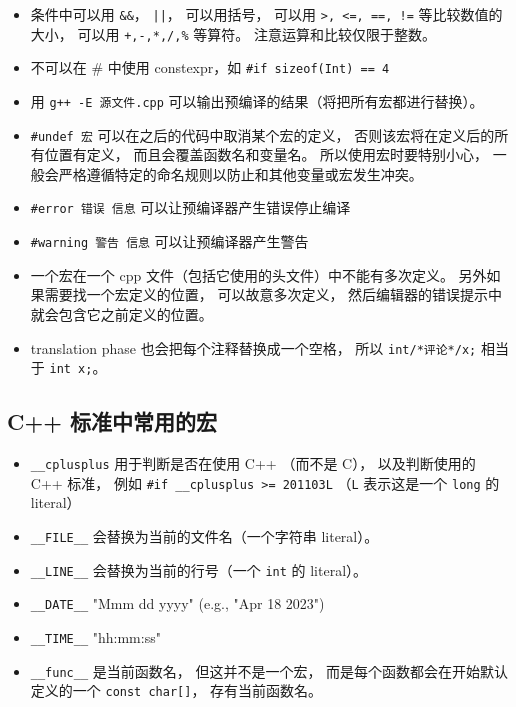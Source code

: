 \begin{itemize}
\item 条件中可以用 \verb`&&`， \verb`||`， 可以用括号， 可以用 \verb`>, <=, ==, !=` 等比较数值的大小， 可以用 \verb`+,-,*,/,%` 等算符。 注意运算和比较仅限于整数。
\item 不可以在 # 中使用 constexpr，如 \verb`#if sizeof(Int) == 4`
\item 用 \verb`g++ -E 源文件.cpp` 可以输出预编译的结果（将把所有宏都进行替换）。
\item \verb`#undef 宏` 可以在之后的代码中取消某个宏的定义， 否则该宏将在定义后的所有位置有定义， 而且会覆盖函数名和变量名。 所以使用宏时要特别小心， 一般会严格遵循特定的命名规则以防止和其他变量或宏发生冲突。
\item \verb`#error 错误 信息` 可以让预编译器产生错误停止编译
\item \verb`#warning 警告 信息` 可以让预编译器产生警告
\item 一个宏在一个 cpp 文件（包括它使用的头文件）中不能有多次定义。 另外如果需要找一个宏定义的位置， 可以故意多次定义， 然后编辑器的错误提示中就会包含它之前定义的位置。
\item translation phase 也会把每个注释替换成一个空格， 所以 \verb`int/*评论*/x;` 相当于 \verb`int x;`。
\end{itemize}

\subsection{C++ 标准中常用的宏}
\begin{itemize}
\item \verb`__cplusplus` 用于判断是否在使用 C++ （而不是 C）， 以及判断使用的 C++ 标准， 例如 \verb`#if __cplusplus >= 201103L` （\verb`L` 表示这是一个 \verb`long` 的 literal）
\item \verb`__FILE__` 会替换为当前的文件名（一个字符串 literal）。
\item \verb`__LINE__` 会替换为当前的行号（一个 \verb`int` 的 literal）。
\item \verb`__DATE__` "Mmm dd yyyy" (e.g., "Apr 18 2023")
\item \verb`__TIME__` "hh:mm:ss"
\item \verb`__func__` 是当前函数名， 但这并不是一个宏， 而是每个函数都会在开始默认定义的一个 \verb`const char[]`， 存有当前函数名。
\end{itemize}

